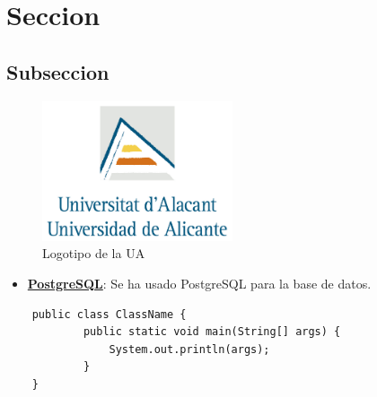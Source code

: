 \section{Seccion}
\subsection{Subseccion}

\begin{figure}[H]
        \centering
        \includegraphics[width=0.5\textwidth]{img/logotipos/logo.jpg}
        \caption{Logotipo de la UA}
        \label{fig:configApi}
\end{figure}

\begin{itemize}
    \item 
    \textcolor{blue}{\href{https://www.postgresql.org/}{\textbf{PostgreSQL}}}: Se ha usado PostgreSQL para la base de datos.
\end{itemize}

\begin{verbatim}
    public class ClassName {
            public static void main(String[] args) {
                System.out.println(args);
            }
    }
\end{verbatim}

\cite{1}